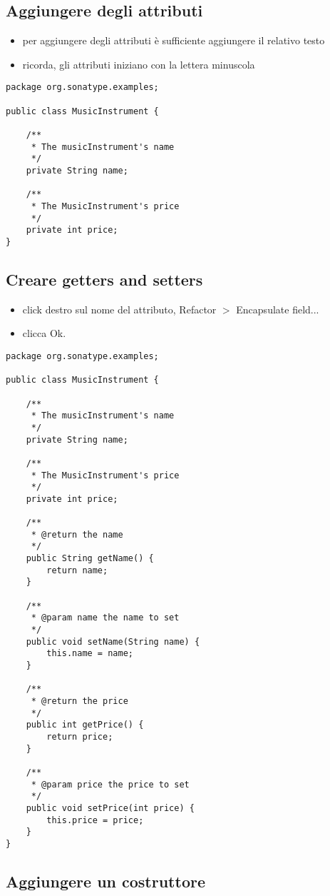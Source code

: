 \documentclass{article}
\begin{document}
\subsection{Aggiungere degli attributi}
\begin{itemize}
\item per aggiungere degli attributi \`e sufficiente aggiungere il relativo testo
\item ricorda, gli attributi iniziano con la lettera minuscola
\end{itemize}
\begin{lstlisting}
package org.sonatype.examples;

public class MusicInstrument {

	/**
	 * The musicInstrument's name
	 */
	private String name;

	/**
	 * The MusicInstrument's price
	 */
	private int price;
}
\end{lstlisting}

\subsection{Creare getters and setters}
\begin{itemize}
\item click destro sul nome del attributo, Refactor $>$ Encapsulate
  field...
\item clicca Ok.
\end{itemize}

\begin{lstlisting}
package org.sonatype.examples;

public class MusicInstrument {

	/**
	 * The musicInstrument's name
	 */
	private String name;

	/**
	 * The MusicInstrument's price
	 */
	private int price;
	
	/**
	 * @return the name
	 */
	public String getName() {
		return name;
	}

	/**
	 * @param name the name to set
	 */
	public void setName(String name) {
		this.name = name;
	}
	
	/**
	 * @return the price
	 */
	public int getPrice() {
		return price;
	}
	
	/**
	 * @param price the price to set
	 */
	public void setPrice(int price) {
		this.price = price;
	}	
}

\end{lstlisting}


\subsection{Aggiungere un costruttore}
\end{document}

